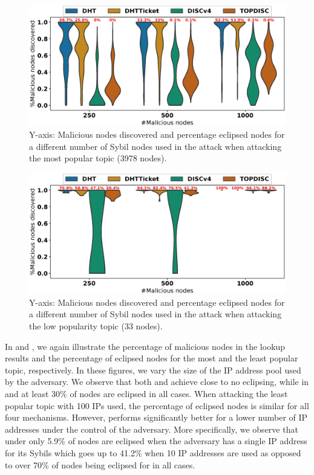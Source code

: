 \begin{figure}[!h]
\includegraphics[width=\linewidth]{results/security/violin_percentEvil_percentageMaliciousDiscovered_t0.eps}
\caption{Y-axis: Malicious nodes discovered and percentage eclipsed nodes for a different number of Sybil nodes used in the attack when attacking the most popular topic (3978 nodes).}
\label{fig:eclipse_evil_t0}
\end{figure}

\begin{figure}[!h]
\includegraphics[width=\linewidth]{results/security/violin_percentEvil_percentageMaliciousDiscovered_t299.eps}
\caption{Y-axis: Malicious nodes discovered and percentage eclipsed nodes for a different number of Sybil nodes used in the attack when attacking the low popularity topic (33 nodes).}
\label{fig:eclipse_evil_t299}
\end{figure}

In  and , we again illustrate the percentage of malicious nodes in the lookup results and the percentage of eclipsed nodes for the most and the least popular topic, respectively. In these figures, we vary the size of the IP address pool used by the adversary. We observe that both \sysname and \discv achieve close to no eclipsing, while in \altname and \altnameticket at least 30\% of nodes are eclipsed in all cases.
When attacking the least popular topic with 100 IPs used, the percentage of eclipsed nodes is similar for all four mechanisms. However, \sysname performs significantly better for a lower number of IP addresses under the control of the adversary.
More specifically, we observe that under \sysname only 5.9\% of nodes are eclipsed when the adversary has a single IP address for its Sybils which goes up to 41.2\% when 10 IP addresses are used as opposed to over 70\% of nodes being eclipsed for \discv in all cases.  

